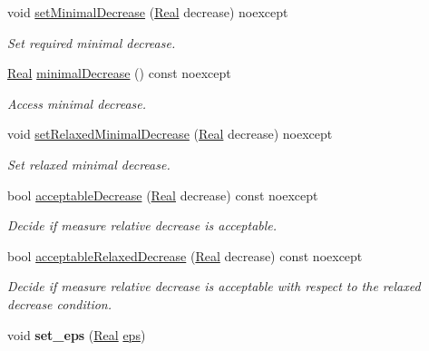 \begin{DoxyCompactItemize}
\item 
void \hyperlink{classSpacy_1_1Mixin_1_1DecreaseCondition_aabc5e2473edace0c87da7fbd9fa0ae61}{set\-Minimal\-Decrease} (\hyperlink{classSpacy_1_1Real}{\-Real} decrease) noexcept
\begin{DoxyCompactList}\small\item\em \-Set required minimal decrease. \end{DoxyCompactList}\item 
\hyperlink{classSpacy_1_1Real}{\-Real} \hyperlink{classSpacy_1_1Mixin_1_1DecreaseCondition_aeeda8b1d9f177fe5dd532e42de09ab44}{minimal\-Decrease} () const noexcept
\begin{DoxyCompactList}\small\item\em \-Access minimal decrease. \end{DoxyCompactList}\item 
void \hyperlink{classSpacy_1_1Mixin_1_1DecreaseCondition_a86d6a8c8fc683c31572fd818a102a362}{set\-Relaxed\-Minimal\-Decrease} (\hyperlink{classSpacy_1_1Real}{\-Real} decrease) noexcept
\begin{DoxyCompactList}\small\item\em \-Set relaxed minimal decrease. \end{DoxyCompactList}\item 
bool \hyperlink{classSpacy_1_1Mixin_1_1DecreaseCondition_a69c0c90daf14fc40461876f71c49ffc2}{acceptable\-Decrease} (\hyperlink{classSpacy_1_1Real}{\-Real} decrease) const noexcept
\begin{DoxyCompactList}\small\item\em \-Decide if measure relative decrease is acceptable. \end{DoxyCompactList}\item 
bool \hyperlink{classSpacy_1_1Mixin_1_1DecreaseCondition_a5ffb5bc008544db96d935a0ca34dcd24}{acceptable\-Relaxed\-Decrease} (\hyperlink{classSpacy_1_1Real}{\-Real} decrease) const noexcept
\begin{DoxyCompactList}\small\item\em \-Decide if measure relative decrease is acceptable with respect to the relaxed decrease condition. \end{DoxyCompactList}\item 
\hypertarget{classSpacy_1_1Mixin_1_1Eps_a818ab6dfab5e4eea583e1302bcc621f8}{void {\bfseries set\-\_\-eps} (\hyperlink{classSpacy_1_1Real}{\-Real} \hyperlink{classSpacy_1_1Mixin_1_1Eps_a812b99b0abc1d78a34b4114907f23f52}{eps})}\label{classSpacy_1_1Mixin_1_1Eps_a818ab6dfab5e4eea583e1302bcc621f8}


\end{DoxyCompactItemize}
